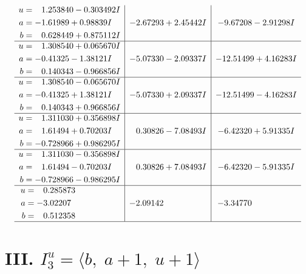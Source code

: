 \documentclass[1p]{elsarticle_modified}
\theoremstyle{definition}
\begin{document}
$$\begin{array}{c|c|c}
\begin{aligned}
u &= \phantom{-}1.253840 - 0.303492 I \\
a &= -1.61989 + 0.98839 I \\
b &= \phantom{-}0.628449 + 0.875112 I\end{aligned}
 & -2.67293 + 2.45442 I & -9.67208 - 2.91298 I \\ \hline\begin{aligned}
u &= \phantom{-}1.308540 + 0.065670 I \\
a &= -0.41325 - 1.38121 I \\
b &= \phantom{-}0.140343 - 0.966856 I\end{aligned}
 & -5.07330 - 2.09337 I & -12.51499 + 4.16283 I \\ \hline\begin{aligned}
u &= \phantom{-}1.308540 - 0.065670 I \\
a &= -0.41325 + 1.38121 I \\
b &= \phantom{-}0.140343 + 0.966856 I\end{aligned}
 & -5.07330 + 2.09337 I & -12.51499 - 4.16283 I \\ \hline\begin{aligned}
u &= \phantom{-}1.311030 + 0.356898 I \\
a &= \phantom{-}1.61494 + 0.70203 I \\
b &= -0.728966 + 0.986295 I\end{aligned}
 & \phantom{-}0.30826 - 7.08493 I & -6.42320 + 5.91335 I \\ \hline\begin{aligned}
u &= \phantom{-}1.311030 - 0.356898 I \\
a &= \phantom{-}1.61494 - 0.70203 I \\
b &= -0.728966 - 0.986295 I\end{aligned}
 & \phantom{-}0.30826 + 7.08493 I & -6.42320 - 5.91335 I \\ \hline\begin{aligned}
u &= \phantom{-}0.285873\phantom{ +0.000000I} \\
a &= -3.02207\phantom{ +0.000000I} \\
b &= \phantom{-}0.512358\phantom{ +0.000000I}\end{aligned}
 & -2.09142\phantom{ +0.000000I} & -3.34770\phantom{ +0.000000I}\\
 \hline 
 \end{array}$$\newpage\newpage\renewcommand{\arraystretch}{1}
\centering \section*{III. $I^u_{3}= \langle b,\;a+1,\;u+1 \rangle$}
\end{document}
